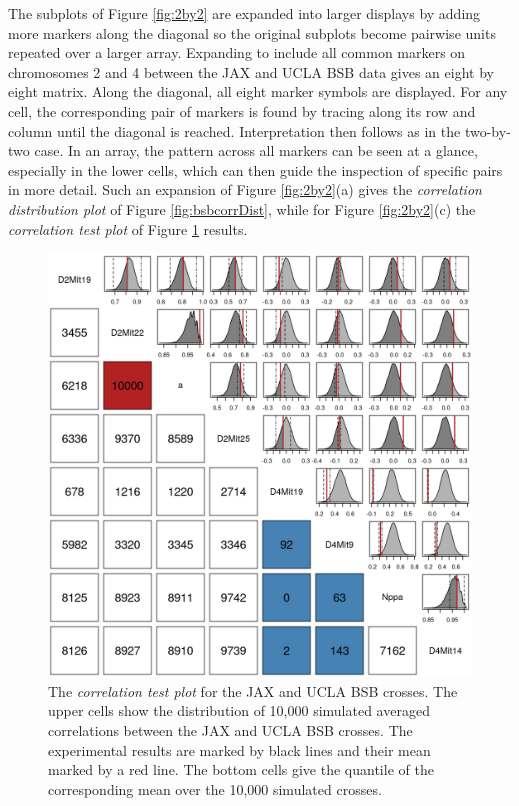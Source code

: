 \documentclass[12pt]{article}
\begin{document}
The subplots of Figure \ref{fig:2by2} are expanded into larger displays by adding more markers along the diagonal so the original subplots become pairwise units repeated over a larger array. Expanding to include all common markers on chromosomes 2 and 4 between the JAX and UCLA BSB data gives an eight by eight matrix. Along the diagonal, all eight marker symbols are displayed. For any cell, the corresponding pair of markers is found by tracing along its row and column until the diagonal is reached. Interpretation then follows as in the two-by-two case. In an array, the pattern across all markers can be seen at a glance, especially in the lower cells, which can then guide the inspection of specific pairs in more detail. Such an expansion of Figure \ref{fig:2by2}(a) gives the \emph{correlation distribution plot} of Figure \ref{fig:bsbcorrDist}, while for Figure \ref{fig:2by2}(c) the \emph{correlation test plot} of Figure \ref{fig:bsbcorrTest} results.

\begin{figure}[h]
  \begin{center}
      \includegraphics[scale = 0.5]{../img/bsbCorrTest.png}
  \end{center}
  \caption{The \emph{correlation test plot} for the JAX and UCLA BSB crosses. The upper cells show the distribution of 10,000 simulated averaged correlations between the JAX and UCLA BSB crosses. The experimental results are marked by black lines and their mean marked by a red line. The bottom cells give the quantile of the corresponding mean over the 10,000 simulated crosses.}
  \label{fig:bsbcorrTest}
\end{figure}
\end{document}
